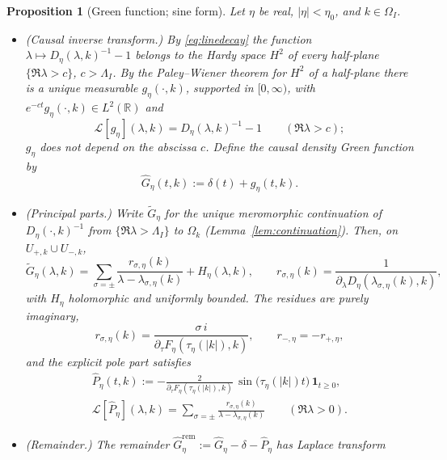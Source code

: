 \documentclass[11pt,a4paper]{amsart}
\newtheorem{proposition}[theorem]{Proposition}
\theoremstyle{definition}
\theoremstyle{remark}
\newcommand{\R}{\mathbb{R}}
\begin{document}
\begin{proposition}[Green function; sine form]\label{prop:green}
Let $\eta$ be real, $|\eta|<\eta_0$, and $k\in\Omega_I$.
\begin{itemize}
\item[\textup{(a)}] \textup{(Causal inverse transform.)} By \eqref{eq:linedecay} the function $\lambda\mapsto D_\eta(\lambda,k)^{-1}-1$ belongs to the Hardy space $H^2$ of every half-plane $\{\Re\lambda>c\}$, $c>\Lambda_I$. By the Paley--Wiener theorem for $H^2$ of a half-plane there is a unique measurable $g_\eta(\cdot,k)$, supported in $[0,\infty)$, with $e^{-ct}g_\eta(\cdot,k)\in L^2(\R)$ and
\[
\mathcal L[g_\eta](\lambda,k)=D_\eta(\lambda,k)^{-1}-1\qquad(\Re\lambda>c);
\]
$g_\eta$ does not depend on the abscissa $c$. Define the causal density Green function by
\begin{equation}\label{eq:Gdef}
\widehat G_\eta(t,k):=\delta(t)+g_\eta(t,k).
\end{equation}
\item[\textup{(b)}] \textup{(Principal parts.)} Write $\widetilde G_\eta$ for the unique meromorphic continuation of $D_\eta(\cdot,k)^{-1}$ from $\{\Re\lambda>\Lambda_I\}$ to $\Omega_k$ (Lemma~\ref{lem:continuation}). Then, on $U_{+,k}\cup U_{-,k}$,
\begin{equation}\label{eq:laurent}
\widetilde G_\eta(\lambda,k)=\sum_{\sigma=\pm}\frac{r_{\sigma,\eta}(k)}{\lambda-\lambda_{\sigma,\eta}(k)}+H_\eta(\lambda,k),
\qquad r_{\sigma,\eta}(k)=\frac{1}{\partial_\lambda D_\eta(\lambda_{\sigma,\eta}(k),k)},
\end{equation}
with $H_\eta$ holomorphic and uniformly bounded. The residues are purely imaginary,
\begin{equation}\label{eq:residuesine}
r_{\sigma,\eta}(k)=\frac{\sigma\,i}{\partial_\tau F_\eta(\tau_\eta(|k|),k)},\qquad r_{-,\eta}=-r_{+,\eta},
\end{equation}
and the explicit \emph{pole part} satisfies
\begin{equation}\label{eq:sine}
\begin{gathered}
\widehat P_\eta(t,k):=-\frac{2}{\partial_\tau F_\eta(\tau_\eta(|k|),k)}\,\sin\bigl(\tau_\eta(|k|)t\bigr)\,\mathbf 1_{t\ge0},\\
\mathcal L[\widehat P_\eta](\lambda,k)=\sum_{\sigma=\pm}\frac{r_{\sigma,\eta}(k)}{\lambda-\lambda_{\sigma,\eta}(k)}
\qquad(\Re\lambda>0).
\end{gathered}
\end{equation}
\item[\textup{(c)}] \textup{(Remainder.)} The remainder $\widehat G^{\mathrm{rem}}_\eta:=\widehat G_\eta-\delta-\widehat P_\eta$ has Laplace transform

\end{itemize}
\end{proposition}
\end{document}
